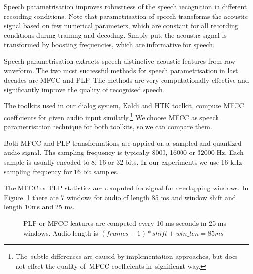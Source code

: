 Speech parametrisation improves robustness of the speech recognition in different recording conditions.
Note that parametrisation of speech transforms the acoustic signal based on few numerical parameters, which are constant for all recording conditions during training and decoding.
Simply put, the acoustic signal is transformed by boosting frequencies, which are informative for speech.

Speech parametrisation extracts speech-distinctive acoustic features from raw waveform.
The two most successful methods for speech parametrisation in last decades are \ac{MFCC}\cite{davis1980comparison} and \ac{PLP}\cite{hermansky1990perceptual}.
The methods are very computationally effective and significantly improve the quality of recognised speech.


The toolkits used in our dialog system, Kaldi and \ac{HTK} toolkit, compute \ac{MFCC} coefficients for given audio input similarly.\footnote{The~subtle differences are caused by implementation approaches, but does not effect the quality of~\ac{MFCC} coefficients in~significant way.}
We choose \ac{MFCC} as speech parametrisation technique for both toolkits, so we can compare them.

Both \ac{MFCC} and \ac{PLP} transformations are applied on a~sampled and quantized audio signal.
The sampling frequency is typically 8000, 16000 or 32000 Hz.
Each sample is usually encoded to 8, 16 or 32 bits. 
In our experiments we use 16 kHz sampling frequency for 16 bit samples.  

The \ac{MFCC} or \ac{PLP} statistics are computed for signal for overlapping windows.
In Figure~\ref{fig:mfcc_window} there are 7 windows for audio of length 85 ms and window shift and length 10ms and 25 ms.

\begin{figure}[!htp]
    \begin{center}
    
    \caption{\ac{PLP} or \ac{MFCC} features are computed every 10 ms seconds in 25 ms windows.
    Audio length is $(frames-1)*shift + win\_len = 85ms$}
    \label{fig:mfcc_window} 
    \end{center}
\end{figure}

